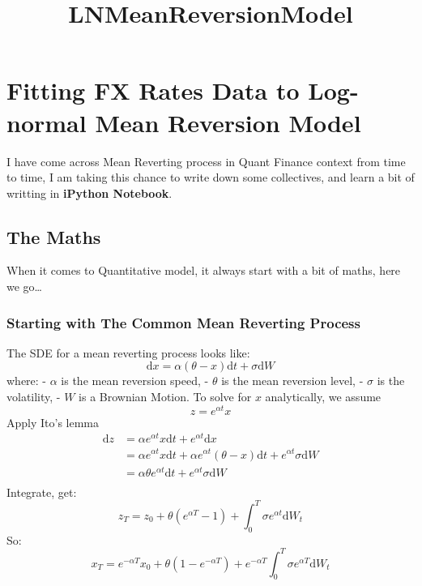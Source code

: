 \documentclass{article}
\title{LNMeanReversionModel}
\begin{document}
    
    
    \maketitle
    
    

    

    \section{Fitting FX Rates Data to Log-normal Mean Reversion Model}


    I have come across Mean Reverting process in Quant Finance context from
time to time, I am taking this chance to write down some collectives,
and learn a bit of writting in \textbf{iPython Notebook}.


    \subsection{The Maths}


    When it comes to Quantitative model, it always start with a bit of
maths, here we go\ldots{}


    \subsubsection{Starting with The Common Mean Reverting Process}


    The SDE for a mean reverting process looks like:
\[\mathrm{d}x=\alpha(\theta-x) \mathrm{d}t + \sigma \mathrm{d}W\] where:
- $\alpha$ is the mean reversion speed, - $\theta$ is the mean reversion
level, - $\sigma$ is the volatility, - $W$ is a Brownian Motion. To
solve for $x$ analytically, we assume \[z=e^{\alpha t} x\] Apply Ito's
lemma \[
\begin{equation}
\begin{split}
\mathrm{d}z & =\alpha e^{\alpha t} x \mathrm{d}t + e^{\alpha t} \mathrm{d}x  \\
 & = \alpha e^{\alpha t} x \mathrm{d}t + \alpha e^{\alpha t}(\theta-x) \mathrm{d}t + e^{\alpha t} \sigma \mathrm{d}W \\
 & = \alpha \theta e^{\alpha t} \mathrm{d}t + e^{\alpha t} \sigma \mathrm{d}W \\
\end{split}
\end{equation}
\] Integrate, get:
\[z_T = z_0 + \theta (e^{\alpha T}-1) + \int_0^T \sigma e^{\alpha t} \mathrm{d}W_t\]
So:
\[x_T=e^{-\alpha T}x_0 + \theta (1-e^{-\alpha T}) + e^{-\alpha T} \int_0^T \sigma e^{\alpha T} \mathrm{d}W_t\]
\end{document}
